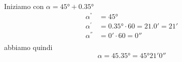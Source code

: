 Iniziamo con
$\alpha=\ang{45}+\ang{0.35}$
\begin{align*}
\alpha^{\si{\degree}}&=\ang{45}\\
\alpha^{\si{\arcminute}}&=\ang{0.35}\cdot 60=\ang{;21.0;}=\ang{;21;}\\
\alpha^{\si{\arcsecond}}&=\ang{;0;}\cdot 60=\ang{;;0}\\
\end{align*}
abbiamo quindi
\[\alpha=\ang{45.35}=\ang{45;21;0}\]
